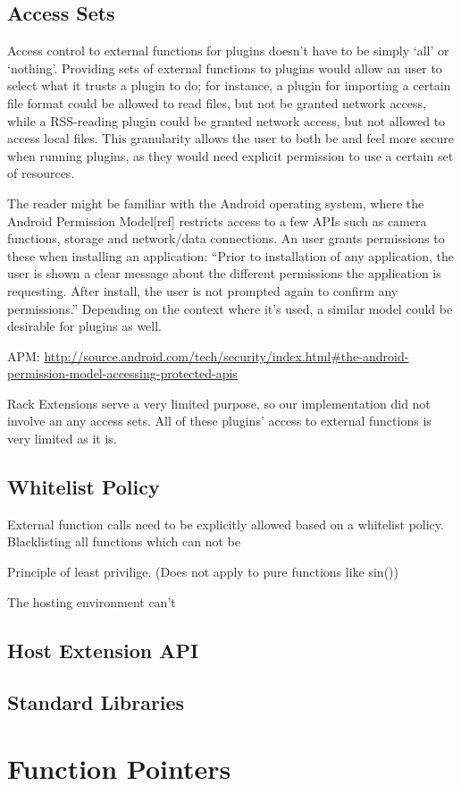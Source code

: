 \subsection {Access Sets}

Access control to external functions for plugins doesn't have to be simply `all'
or `nothing'. Providing sets of external functions to plugins would allow an
user to select what it trusts a plugin to do; for instance, a plugin for
importing a certain file format could be allowed to read files, but not be
granted network access, while a RSS-reading plugin could be granted network
access, but not allowed to access local files. This granularity allows the user
to both be and feel more secure when running plugins, as they would need
explicit permission to use a certain set of resources.

The reader might be familiar with the Android operating system, where the
Android Permission Model[ref] restricts access to a few APIs such as camera
functions, storage and network/data connections. An user grants permissions to
these when installing an application: ``Prior to installation of any
application, the user is shown a clear message about the different permissions
the application is requesting. After install, the user is not prompted again to
confirm any permissions.'' Depending on the context where it's used, a similar
model could be desirable for plugins as well.

APM: \url{http://source.android.com/tech/security/index.html#the-android-permission-model-accessing-protected-apis}

Rack Extensions serve a very limited purpose, so our implementation did not
involve an any access sets. All of these plugins' access to external functions
is very limited as it is.

\subsection {Whitelist Policy}

External function calls need to be explicitly allowed based on a whitelist
policy. Blacklisting all functions which can not be 

Principle of least privilige. (Does not apply to pure functions like sin())

The hosting environment can't 

\subsection {Host Extension API}

\subsection {Standard Libraries}


\section {Function Pointers}


